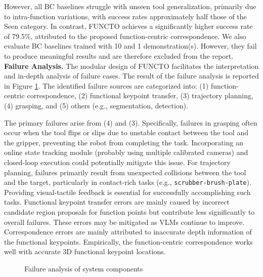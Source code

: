 However, all BC baselines struggle with unseen tool generalization, primarily due to intra-function variations, with success rates approximately half those of the Seen category. In contrast, FUNCTO achieves a significantly higher success rate of 79.5\%, attributed to the proposed function-centric correspondence. We also evaluate BC baselines trained with 10 and 1 demonstration(s). However, they fail to produce meaningful results and are therefore excluded from the report. \\


\noindent \textbf{Failure Analysis.} The modular design of FUNCTO facilitates the interpretation and in-depth analysis of failure cases. The result of the failure analysis is reported in Figure \ref{fig:error}. The identified failure sources are categorized into: (1) function-centric correspondence, (2) functional keypoint transfer, (3) trajectory planning, (4) grasping, and (5) others (e.g., segmentation, detection). 

The primary failures arise from (4) and (3). Specifically, failures in grasping often occur when the tool flips or slips due to unstable contact between the tool and the gripper, preventing the robot from completing the task. Incorporating an online state tracking module (probably using multiple calibrated cameras) and closed-loop execution could potentially mitigate this issue. For trajectory planning, failures primarily result from unexpected collisions between the tool and the target, particularly in contact-rich tasks (e.g., \texttt{scrubber-brush-plate}). Providing visual-tactile feedback is essential for successfully accomplishing such tasks. Functional keypoint transfer errors are mainly caused by incorrect candidate region proposals for function points but contribute less significantly to overall failures. These errors may be mitigated as VLMs continue to improve. Correspondence errors are mainly attributed to inaccurate depth information of the functional keypoints. Empirically, the function-centric correspondence works well with accurate 3D functional keypoint locations.


\begin{figure}[t]
  \centering
    \vspace*{-0.1in}
  \caption{Failure analysis of system components}
  \label{fig:error}
  \vspace*{-0.3in}
\end{figure}


